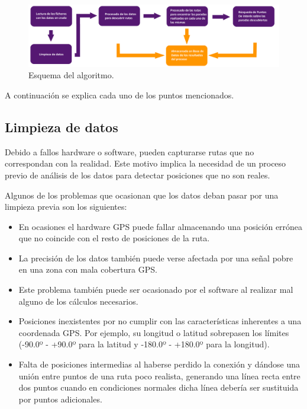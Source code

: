 \begin{figure}[h]
  \centering
    \includegraphics[width=1\textwidth]{../img/diagramas/algoritmo.png}
  \caption{Esquema del algoritmo.}
  \label{esquema}
\end{figure}

A continuación se explica cada uno de los puntos mencionados.

\subsection{Limpieza de datos}

Debido a fallos hardware o software, pueden capturarse rutas que no correspondan con la realidad. Este motivo implica la necesidad de un proceso previo de análisis de los datos para detectar posiciones que no son reales.

Algunos de los problemas que ocasionan que los datos deban pasar por una limpieza previa son los siguientes:

\begin{itemize}
	\item En ocasiones el hardware GPS puede fallar almacenando una posición errónea que no coincide con el resto de posiciones de la ruta.
	\item La precisión de los datos también puede verse afectada por una señal pobre en una zona con mala cobertura GPS.
	\item Este problema también puede ser ocasionado por el software al realizar mal alguno de los cálculos necesarios.
	\item Posiciones inexistentes por no cumplir con las características inherentes a una coordenada GPS. Por ejemplo, su longitud o latitud sobrepasen los límites (-90.0º - +90.0º para la latitud y -180.0º - +180.0º para la longitud).
	\item Falta de posiciones intermedias al haberse perdido la conexión y dándose una unión entre puntos de una ruta poco realista, generando una línea recta entre dos puntos cuando en condiciones normales dicha línea debería ser sustituida por puntos adicionales.
\end{itemize}

